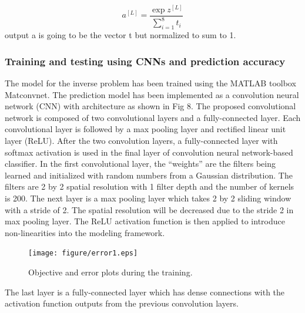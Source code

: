 \begin{equation}
a^{[L]} = \frac{\exp z^{[L]}}{\sum_{i=1}^{8} t_i} 
\end{equation}
output a is going to be the vector t but normalized to sum to 1.



\subsubsection{Training and testing using CNNs and prediction accuracy}
\label{subsubsec3}

The model for the inverse problem has been trained using the MATLAB toolbox Matconvnet.
The prediction model has been implemented as a convolution neural network (CNN) with architecture as shown in Fig 8.
The proposed convolutional network is composed of two convolutional layers and a fully-connected layer.
Each convolutional layer is followed by a max pooling layer and rectified linear unit layer (ReLU).
After the two convolution layers, a fully-connected layer with softmax activation is used in the final layer of convolution neural network-based classifier.
In the first convolutional layer, the “weights” are the filters being learned and initialized with random numbers from a Gaussian distribution.
The filters are 2 by 2 spatial resolution with 1 filter depth and the number of kernels is 200.
The next layer is a max pooling layer which takes 2 by 2 sliding window with a stride of 2.
The spatial resolution will be decreased due to the stride 2 in max pooling layer.
The ReLU activation function is then applied to introduce non-linearities into the modeling framework.
\label{subsubsec3}
\begin{figure}
\centering
\texttt{[image: figure/error1.eps]}
\caption{Objective and error plots during the training.}
\label{fig:5}       
\end{figure}
The last layer is a fully-connected layer which has dense connections with the activation function outputs from the previous convolution layers.
